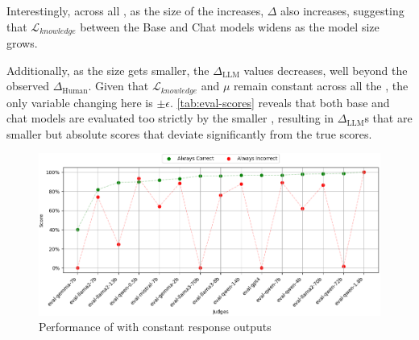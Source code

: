 Interestingly, across all \judgemodels, as the size of the \evaluatormodel increases, $\Delta$ also increases, suggesting that $\mathcal{L}_{knowledge}$ between the Base and Chat models widens as the model size grows.

Additionally, as the \judgemodel size gets smaller, the $\Delta_{\text{LLM}}$ values decreases, well beyond the observed $\Delta_{\text{Human}}$. Given that $\mathcal{L}_{knowledge}$ and $\mu$ remain constant across all the \judgemodels, the only variable changing here is $\pm \epsilon$. \cref{tab:eval-scores} reveals that both base and chat models are evaluated too strictly by the smaller \judgemodels, resulting in $\Delta_{\text{LLM}}$s that are smaller but absolute scores that deviate significantly from the true scores. 


\begin{figure}[h]
    \centering
    \includegraphics[width=\textwidth]{figures/Judgeguidelines.png}
    \caption{Performance of \judgemodels with constant response outputs }
    \label{fig:judge_dummy}
\end{figure}




